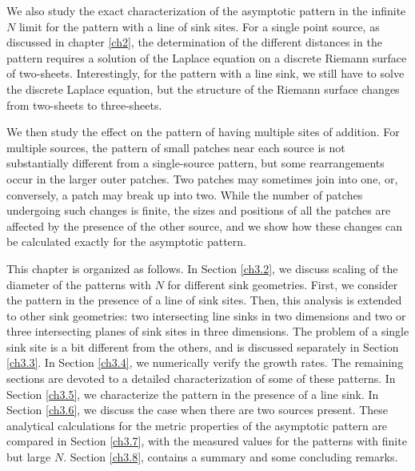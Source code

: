 \documentclass[11pt,a4paper]{book}
\begin{document}
We also study the exact characterization of the asymptotic pattern in the infinite $N$ limit for
the pattern with a line of sink sites. For a single point source, as
discussed in chapter \ref{ch2},
the determination of the different distances in the pattern requires a solution
of the Laplace equation on a discrete Riemann surface of two-sheets.
Interestingly, for the pattern with a line sink, we still have to solve the
discrete Laplace equation, but the structure of the Riemann surface
changes from two-sheets to three-sheets.
 
We then study the effect on the pattern of having multiple sites of addition.
For multiple sources, the pattern of small patches near each source is not
substantially different from a single-source pattern, but some rearrangements
occur in the larger outer patches. Two patches may sometimes join into one,
or, conversely, a patch may break up into two. While the number of patches
undergoing such changes is finite, the sizes and positions of all the patches are
affected by the presence of the other source, and we show how these changes
can be calculated exactly for the asymptotic pattern.

This chapter is organized as follows. In Section \ref{ch3.2}, we discuss scaling of the diameter of the patterns with $N$ for different
sink geometries. First, we consider the pattern in the presence of a line of sink sites. Then,
this analysis is extended to other sink geometries: two intersecting line
sinks in two dimensions and two or three intersecting planes of sink sites in three
dimensions. The problem of a single sink site is a bit different from the others, and
is discussed separately in Section \ref{ch3.3}. In Section
\ref{ch3.4}, we numerically verify the
growth rates. The remaining sections are devoted to
a detailed characterization of some of these patterns. In Section
\ref{ch3.5}, we
characterize the pattern in the presence of a line sink. In Section
\ref{ch3.6},
we discuss the case when there are two sources present. These analytical
calculations for the metric properties of the asymptotic pattern are
compared in Section \ref{ch3.7}, with the measured values for the patterns with finite but large $N$.
Section \ref{ch3.8}, contains a summary and some concluding remarks.
\end{document}
